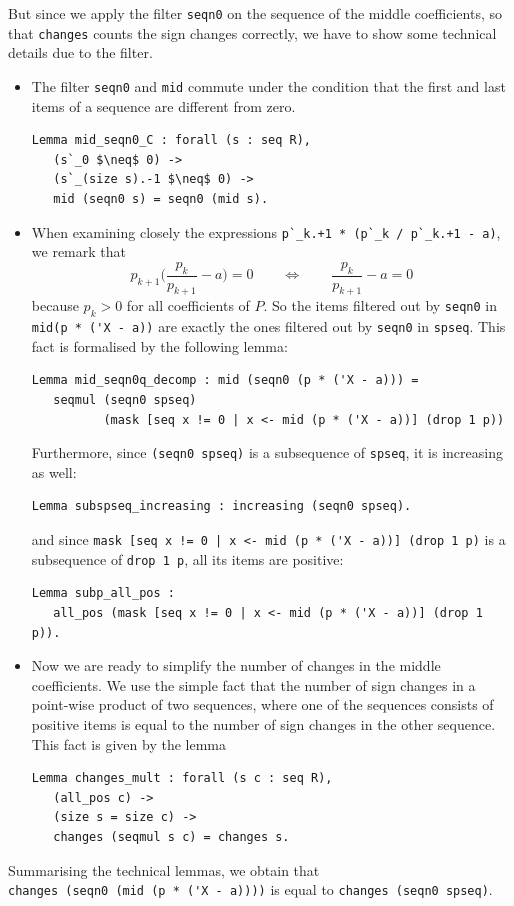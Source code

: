 \documentclass[11pt, a4paper]{article}
\begin{document}
 But since we apply the filter \lstinline!seqn0! on the sequence of the middle coefficients, so that \lstinline!changes! counts the sign changes correctly, we have to show some technical details due to the filter.
\begin{itemize}
 \item The filter \lstinline!seqn0! and \lstinline!mid! commute under the condition that the first and last items of a sequence are different from zero.
\begin{lstlisting}
Lemma mid_seqn0_C : forall (s : seq R),
   (s`_0 $\neq$ 0) ->
   (s`_(size s).-1 $\neq$ 0) ->
   mid (seqn0 s) = seqn0 (mid s).
\end{lstlisting}

 \item When examining closely the expressions \lstinline!p`_k.+1 * (p`_k / p`_k.+1 - a)!, we remark that 
\[p_{k+1} \biggl( \frac{p_k}{p_{k+1}} - a\biggr) = 0 \qquad \Leftrightarrow \qquad \frac{p_k}{p_{k+1}} - a = 0 \]
because $p_k >0$ for all coefficients of $P$. So the items filtered out by \lstinline!seqn0! in \lstinline!mid(p * ('X - a))! are exactly the ones filtered out by \lstinline!seqn0! in \lstinline!spseq!.
This fact is formalised by the following lemma:
\begin{lstlisting}
Lemma mid_seqn0q_decomp : mid (seqn0 (p * ('X - a))) =
   seqmul (seqn0 spseq)
          (mask [seq x != 0 | x <- mid (p * ('X - a))] (drop 1 p))
\end{lstlisting}
Furthermore, since \lstinline!(seqn0 spseq)! is a subsequence of \lstinline!spseq!, it is increasing as well:
\begin{lstlisting}
Lemma subspseq_increasing : increasing (seqn0 spseq).
\end{lstlisting}
and since \lstinline{mask [seq x != 0 | x <- mid (p * ('X - a))] (drop 1 p)} is a subsequence of \lstinline!drop 1 p!, all its items are positive:
\begin{lstlisting}
Lemma subp_all_pos :
   all_pos (mask [seq x != 0 | x <- mid (p * ('X - a))] (drop 1 p)).
\end{lstlisting}
 \item Now we are ready to simplify the number of changes in the middle coefficients. We use the simple fact that the number of sign changes in a point-wise product of two sequences, where one of the sequences consists of positive items is equal to the number of sign changes in the other sequence. This fact is given by the lemma
\begin{lstlisting}
Lemma changes_mult : forall (s c : seq R),
   (all_pos c) ->
   (size s = size c) ->
   changes (seqmul s c) = changes s.
\end{lstlisting}
\end{itemize}
Summarising the technical lemmas, we obtain that \\ \lstinline!changes (seqn0 (mid (p * ('X - a))))! is equal to \lstinline!changes (seqn0 spseq)!.
\end{document}
